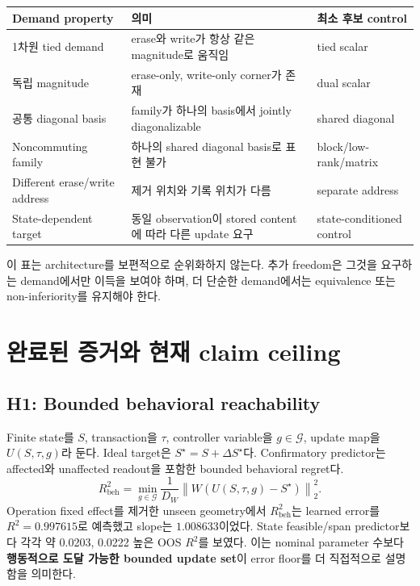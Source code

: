\documentclass[10.3pt,a4paper]{article}
\begin{document}
\begin{center}
\begin{tabularx}{\textwidth}{lXl}
\toprule
Demand property & 의미 & 최소 후보 control \\
\midrule
1차원 tied demand & erase와 write가 항상 같은 magnitude로 움직임 & tied scalar \\
독립 magnitude & erase-only, write-only corner가 존재 & dual scalar \\
공통 diagonal basis & family가 하나의 basis에서 jointly diagonalizable & shared diagonal \\
Noncommuting family & 하나의 shared diagonal basis로 표현 불가 & block/low-rank/matrix \\
Different erase/write address & 제거 위치와 기록 위치가 다름 & separate address \\
State-dependent target & 동일 observation이 stored content에 따라 다른 update 요구 & state-conditioned control \\
\bottomrule
\end{tabularx}
\end{center}

이 표는 architecture를 보편적으로 순위화하지 않는다. 추가 freedom은 그것을 요구하는 demand에서만 이득을 보여야 하며, 더 단순한 demand에서는 equivalence 또는 non-inferiority를 유지해야 한다.

\section{완료된 증거와 현재 claim ceiling}
\subsection{H1: Bounded behavioral reachability}
Finite state를 $S$, transaction을 $\tau$, controller variable을 $g\in\mathcal G$, update map을 $U(S,\tau,g)$라 둔다. Ideal target은 $S^\star=S+\Delta S^\star$다. Confirmatory predictor는 affected와 unaffected readout을 포함한 bounded behavioral regret다.
\[
R_{\mathrm{beh}}^2=
\min_{g\in\mathcal G}
\frac{1}{D_W}
\left\|W\left(U(S,\tau,g)-S^\star\right)\right\|_2^2.
\]
Operation fixed effect를 제거한 unseen geometry에서 $R_{\mathrm{beh}}^2$는 learned error를 $R^2=0.997615$로 예측했고 slope는 $1.008633$이었다. State feasible/span predictor보다 각각 약 0.0203, 0.0222 높은 OOS $R^2$를 보였다. 이는 nominal parameter 수보다 \textbf{행동적으로 도달 가능한 bounded update set}이 error floor를 더 직접적으로 설명함을 의미한다.
\end{document}
